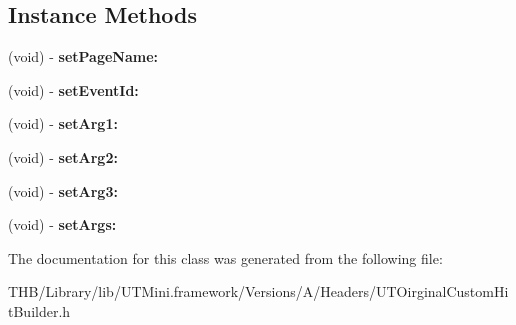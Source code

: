 \subsection*{Instance Methods}
\begin{DoxyCompactItemize}
\item 
\mbox{\label{interface_u_t_oirginal_custom_hit_builder_ae09959516d69abfd7d0621c5eb1fd383}} 
(void) -\/ {\bfseries set\+Page\+Name\+:}
\item 
\mbox{\label{interface_u_t_oirginal_custom_hit_builder_a77429d78157917486f48ca005578ed77}} 
(void) -\/ {\bfseries set\+Event\+Id\+:}
\item 
\mbox{\label{interface_u_t_oirginal_custom_hit_builder_abbb3bc8749e6403dbb1e4ccdb8e944a3}} 
(void) -\/ {\bfseries set\+Arg1\+:}
\item 
\mbox{\label{interface_u_t_oirginal_custom_hit_builder_a9da19e9f40bf197943f1df95acbebb18}} 
(void) -\/ {\bfseries set\+Arg2\+:}
\item 
\mbox{\label{interface_u_t_oirginal_custom_hit_builder_a59f6b8e3301fd6bfbcf3384449a98f20}} 
(void) -\/ {\bfseries set\+Arg3\+:}
\item 
\mbox{\label{interface_u_t_oirginal_custom_hit_builder_af54bb84cb2b2e53682d1d79d970ec3f4}} 
(void) -\/ {\bfseries set\+Args\+:}
\end{DoxyCompactItemize}


The documentation for this class was generated from the following file\+:\begin{DoxyCompactItemize}
\item 
T\+H\+B/\+Library/lib/\+U\+T\+Mini.\+framework/\+Versions/\+A/\+Headers/U\+T\+Oirginal\+Custom\+Hit\+Builder.\+h\end{DoxyCompactItemize}
